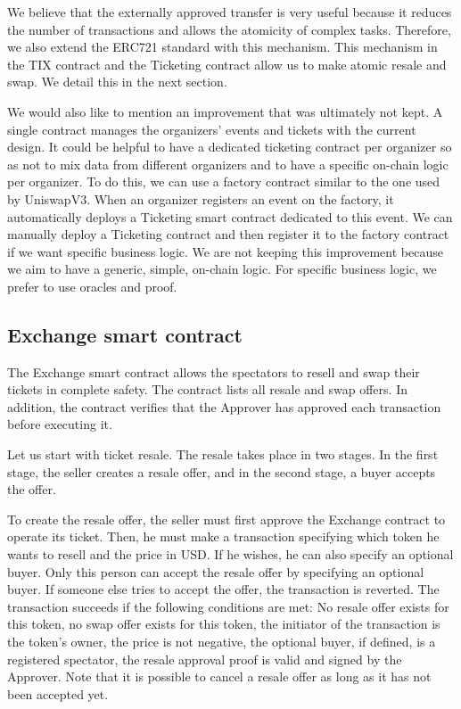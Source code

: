 \documentclass[a4paper,11pt,oneside]{report}
\begin{document}
We believe that the externally approved transfer is very useful because it reduces the number of transactions and allows the atomicity of complex tasks. Therefore, we also extend the ERC721 standard with this mechanism. This mechanism in the TIX contract and the Ticketing contract allow us to make atomic resale and swap. We detail this in the next section.

We would also like to mention an improvement that was ultimately not kept. A single contract manages the organizers' events and tickets with the current design. It could be helpful to have a dedicated ticketing contract per organizer so as not to mix data from different organizers and to have a specific on-chain logic per organizer. To do this, we can use a factory contract similar to the one used by UniswapV3. When an organizer registers an event on the factory, it automatically deploys a Ticketing smart contract dedicated to this event. We can manually deploy a Ticketing contract and then register it to the factory contract if we want specific business logic. We are not keeping this improvement because we aim to have a generic, simple, on-chain logic. For specific business logic, we prefer to use oracles and proof.

\subsection{Exchange smart contract}
The Exchange smart contract allows the spectators to resell and swap their tickets in complete safety. The contract lists all resale and swap offers. In addition, the contract verifies that the Approver has approved each transaction before executing it.

Let us start with ticket resale. The resale takes place in two stages. In the first stage, the seller creates a resale offer, and in the second stage, a buyer accepts the offer.

To create the resale offer, the seller must first approve the Exchange contract to operate its ticket. Then, he must make a transaction specifying which token he wants to resell and the price in USD. If he wishes, he can also specify an optional buyer. Only this person can accept the resale offer by specifying an optional buyer. If someone else tries to accept the offer, the transaction is reverted. The transaction succeeds if the following conditions are met: No resale offer exists for this token, no swap offer exists for this token, the initiator of the transaction is the token's owner, the price is not negative, the optional buyer, if defined, is a registered spectator, the resale approval proof is valid and signed by the Approver. Note that it is possible to cancel a resale offer as long as it has not been accepted yet.
\end{document}

